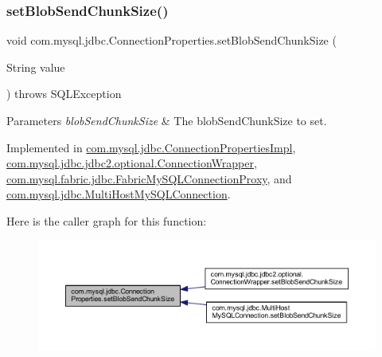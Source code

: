 \subsubsection{\texorpdfstring{set\+Blob\+Send\+Chunk\+Size()}{setBlobSendChunkSize()}}
{\footnotesize\ttfamily void com.\+mysql.\+jdbc.\+Connection\+Properties.\+set\+Blob\+Send\+Chunk\+Size (\begin{DoxyParamCaption}\item[{String}]{value }\end{DoxyParamCaption}) throws S\+Q\+L\+Exception}


\begin{DoxyParams}{Parameters}
{\em blob\+Send\+Chunk\+Size} & The blob\+Send\+Chunk\+Size to set. \\
\hline
\end{DoxyParams}


Implemented in \mbox{\hyperlink{classcom_1_1mysql_1_1jdbc_1_1_connection_properties_impl_a7bf8ddcb8103feee679175048c14a6fc}{com.\+mysql.\+jdbc.\+Connection\+Properties\+Impl}}, \mbox{\hyperlink{classcom_1_1mysql_1_1jdbc_1_1jdbc2_1_1optional_1_1_connection_wrapper_ad2a5eec9a52c3c5a68de2bc6af8f333e}{com.\+mysql.\+jdbc.\+jdbc2.\+optional.\+Connection\+Wrapper}}, \mbox{\hyperlink{classcom_1_1mysql_1_1fabric_1_1jdbc_1_1_fabric_my_s_q_l_connection_proxy_a4bf84a61baa3219b6603772de1120c58}{com.\+mysql.\+fabric.\+jdbc.\+Fabric\+My\+S\+Q\+L\+Connection\+Proxy}}, and \mbox{\hyperlink{classcom_1_1mysql_1_1jdbc_1_1_multi_host_my_s_q_l_connection_a8ab368d3783dcf159d7b5055fa104362}{com.\+mysql.\+jdbc.\+Multi\+Host\+My\+S\+Q\+L\+Connection}}.

Here is the caller graph for this function\+:\nopagebreak
\begin{figure}[H]
\begin{center}
\leavevmode
\includegraphics[width=350pt]{interfacecom_1_1mysql_1_1jdbc_1_1_connection_properties_ab16063397e021c5f18662127d274d4d5_icgraph}
\end{center}
\end{figure}
\mbox{\label{interfacecom_1_1mysql_1_1jdbc_1_1_connection_properties_ae88f31bc280f1a82f70847797a0a25e7}} 
